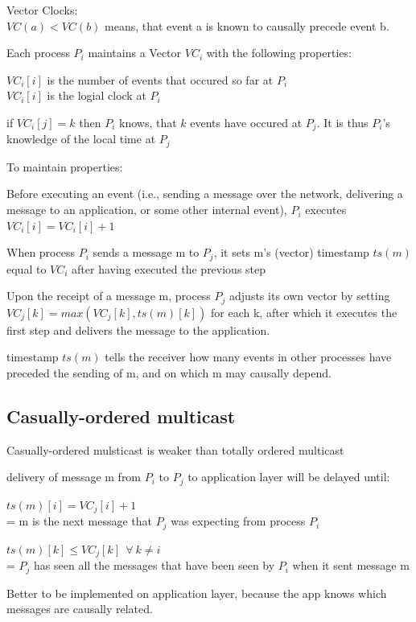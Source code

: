 \documentclass[ngerman,a4paper]{report}
\begin{document}
\begin{compactitem}
	\item Vector Clocks: \\
		$VC(a) < VC(b)$ means, that event a is known to causally precede event b.
	\item Each process $P_i$ maintains a Vector $VC_i$ with the following properties:
		\begin{compactenum}
			\item $VC_i[i]$ is the number of events that occured so far at $P_i$ \\
				$VC_i[i]$ is the logial clock at $P_i$
			\item if $VC_i[j]=k$ then $P_i$ knows, that $k$ events have occured at $P_j$. It is thus $P_i$'s knowledge of the local time at $P_j$
		\end{compactenum}
 	\item To maintain properties:
 			\begin{compactenum}
 			\item Before executing an event (i.e., sending a message over the network, delivering a message to an application, or some other internal event), $P_i$ executes $VC_i[i] = VC_i[i] + 1$
 			\item When process $P_i$ sends a message m to $P_j$, it sets m's (vector) timestamp $ts(m)$ equal to $VC_i$ after having executed the previous step
 			\item Upon the receipt of a message m, process $P_j$ adjusts its own vector by setting $VC_j[k] = max(VC_j[k], ts(m)[k])$ for each k, after which it executes the first step and delivers the message to the application.
		\end{compactenum}
		\item timestamp $ts (m)$ tells the receiver how many events in other processes have preceded the sending of m, and on which m may causally depend.
\end{compactitem}
\subsection{Casually-ordered multicast}
\begin{compactitem}
    \item Casually-ordered mulsticast is weaker than totally ordered multicast
    \item delivery of message m from $P_i$ to $P_j$ to application layer will be delayed until:
	\begin{compactenum}
		\item $ts(m)[i] = VC_j[i]+1$ \\
		= m is the next message that $P_j$ was expecting from process $P_i$
		\item $ts(m)[k] \leq VC_j[k] \ \ \forall \ k \neq i$ \\
		= $P_j$ has seen all the messages that have been seen by $P_i$ when it sent message m

	\end{compactenum}
	\item Better to be implemented on application layer, because the app knows which messages are causally related.
\end{compactitem}
\end{document}

